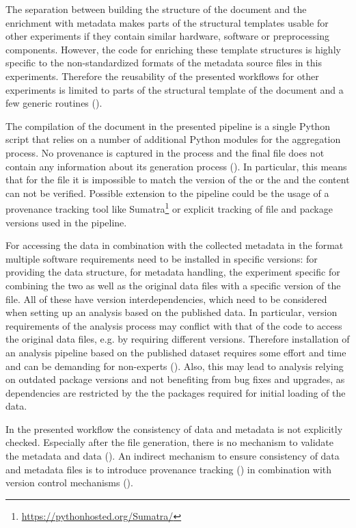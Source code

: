 The separation between building the structure of the  document and the enrichment with metadata makes parts of the structural templates usable for other experiments if they contain similar hardware, software or preprocessing components. However, the code for enriching these template structures is highly specific to the non-standardized formats of the metadata source files in this experiments. Therefore the reusability of the presented workflows for other experiments is limited to parts of the structural template of the  document and a few generic routines ().

The compilation of the  document in the presented pipeline is a single Python script that relies on a number of additional Python modules for the aggregation process. No provenance is captured in the process and the final  file does not contain any information about its generation process (). In particular, this means that for the  file it is impossible to match the version of the  or the  and the content can not be verified. Possible extension to the pipeline could be the usage of a provenance tracking tool like Sumatra\footnote{\url{https://pythonhosted.org/Sumatra/}} or explicit tracking of file and package versions used in the pipeline.

For accessing the data in combination with the collected metadata in the  format multiple software requirements need to be installed in specific versions:  for providing the data structure,  for metadata handling, the experiment specific  for combining the two as well as the original data files with a specific version of the  file. All of these have version interdependencies, which need to be considered when setting up an analysis based on the published data. In particular, version requirements of the analysis process may conflict with that of the code to access the original data files, e.g. by requiring different  versions. Therefore installation of an analysis pipeline based on the published dataset requires some effort and time and can be demanding for non-experts (). Also, this may lead to analysis relying on outdated package versions and not benefiting from bug fixes and upgrades, as dependencies are restricted by the the packages required for initial loading of the data.

In the presented workflow the consistency of data and metadata is not explicitly checked. Especially after the  file generation, there is no mechanism to validate the metadata and data (). An indirect mechanism to ensure consistency of data and metadata files is to introduce provenance tracking () in combination with version control mechanisms ().

